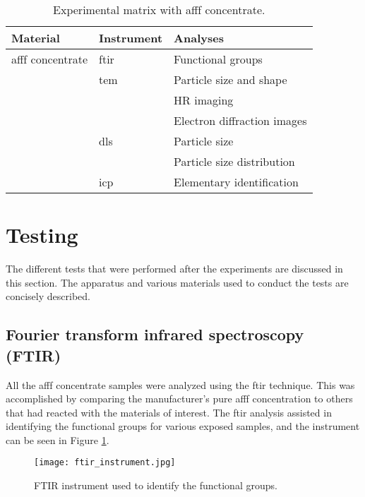 \begin{table}[H]
\centering
\caption{Experimental matrix with \acrshort{afff} concentrate.}

\renewcommand{\arraystretch}{2.5}
\begin{tabularx}{\textwidth}{ XXX }
    \hline
    Material & Instrument & Analyses \\
    \hline
    \acrshort{afff} concentrate & \acrshort{ftir} & Functional groups \\
    & \acrshort{tem} & Particle size and shape \\
    & & HR imaging \\
    & & Electron diffraction images \\
    & \acrshort{dls} & Particle size \\
    & & Particle size distribution \\
    & \acrshort{icp} & Elementary identification \\
    \hline
\end{tabularx}

\end{table}

\section{Testing} 
The different tests that were performed after the experiments are discussed in this section. The apparatus and various materials used to conduct the tests are concisely described.

\subsection{Fourier transform infrared spectroscopy (FTIR)}
All the \acrshort{afff} concentrate samples were analyzed using the \acrshort{ftir} technique. This was accomplished by comparing the manufacturer's pure \acrshort{afff} concentration to others that had reacted with the materials of interest. The \acrshort{ftir} analysis assisted in identifying the functional groups for various exposed samples, and the instrument can be seen in Figure \ref{ch4:figure:ftir}.
 
\begin{figure}[H]
    \centering
    \texttt{[image: ftir\_instrument.jpg]}
    \caption{FTIR instrument used to identify the functional groups.}
    \label{ch4:figure:ftir}
\end{figure}


